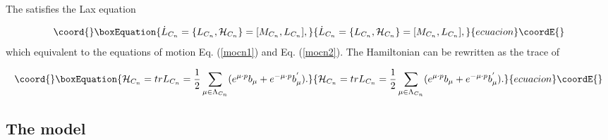 \documentclass[a4paper,12pt]{article}
\begin{document}
The \coordHE{} satisfies the Lax equation

\begin{equation}\coord{}\boxEquation{
\dot{L}_{C_{n}}=\{L_{C_{n}},\mathcal{H}_{C_{n}}\}=\lbrack
M_{C_{n}},L_{C_{n}}\rbrack ,
}{
\dot{L}_{C_{n}}=\{L_{C_{n}},\mathcal{H}_{C_{n}}\}=\lbrack
M_{C_{n}},L_{C_{n}}\rbrack ,
}{ecuacion}\coordE{}\end{equation}
which equivalent to the equations of motion Eq.
(\ref{mocn1}) and Eq. (\ref {mocn2}). The Hamiltonian
\coordHE{} can be rewritten as the trace of
\coordHE{}

\begin{equation}\coord{}\boxEquation{
\mathcal{H}_{C_{n}}=trL_{C_{n}}=\frac{1}{2}\sum_{\mu \in \Lambda
_{C_{n}}}(e^{\mu \cdot p}b_{\mu }+e^{-\mu \cdot p}b_{\mu }^{^{\prime }}).
}{
\mathcal{H}_{C_{n}}=trL_{C_{n}}=\frac{1}{2}\sum_{\mu \in \Lambda
_{C_{n}}}(e^{\mu \cdot p}b_{\mu }+e^{-\mu \cdot p}b_{\mu }^{^{\prime }}).
}{ecuacion}\coordE{}\end{equation}

\subsection{The \coordHE{} model}
\end{document}
